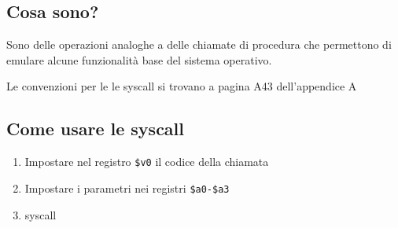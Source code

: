 \subsection{Cosa sono?}
Sono delle operazioni analoghe a delle chiamate di procedura che permettono di emulare alcune funzionalità base del sistema operativo.

Le convenzioni per le le syscall si trovano a pagina A43 dell'appendice A

\subsection{Come usare le syscall}
\begin{enumerate}
    \item Impostare nel registro \texttt{\$v0} il codice della chiamata
    \item Impostare i parametri nei registri \texttt{\$a0-\$a3}
    \item syscall
\end{enumerate}

